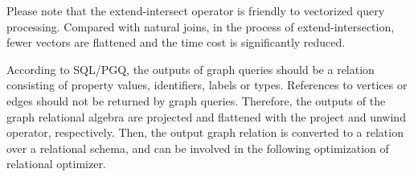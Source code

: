 Please note that the extend-intersect operator is friendly to vectorized query processing.
Compared with natural joins, in the process of extend-intersection, fewer vectors are flattened and the time cost is significantly reduced.

According to SQL/PGQ, the outputs of graph queries should be a relation consisting of property values, identifiers, labels or types.
References to vertices or edges should not be returned by graph queries.
Therefore, the outputs of the graph relational algebra are projected and flattened with the project and unwind operator, respectively.
Then, the output graph relation is converted to a relation over a relational schema, and can be involved in the following optimization of relational optimizer.


